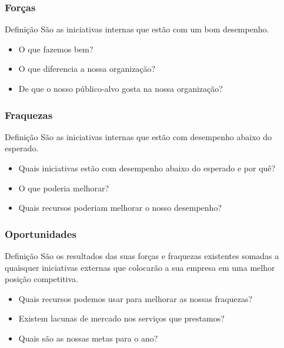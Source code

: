 \documentclass[aspectratio=169]{beamer}
\begin{document}
\begin{frame}
	\frametitle{For\c cas}

	\begin{block}{Defini\c cão}
		São as iniciativas internas que estão com um bom desempenho.
	\end{block}\vfill
	
	\begin{itemize}
		\item O que fazemos bem?
		\item O que diferencia a nossa organização?
		\item De que o nosso público-alvo gosta na nossa organização?
	\end{itemize}
\end{frame}

\begin{frame}
	\frametitle{Fraquezas}

	\begin{block}{Defini\c cão}
		São as iniciativas internas que estão com desempenho abaixo do esperado.
	\end{block}\vfill
	
	\begin{itemize}
		\item Quais iniciativas estão com desempenho abaixo do esperado e por quê?
		\item O que poderia melhorar?
		\item Quais recursos poderiam melhorar o nosso desempenho?
	\end{itemize}
\end{frame}

\begin{frame}
	\frametitle{Oportunidades}

	\begin{block}{Defini\c cão}
		São os resultados das suas forças e fraquezas existentes somadas a quaisquer iniciativas externas que colocarão a sua empresa em uma melhor posição competitiva. 
	\end{block}\vfill
	
	\begin{itemize}
		\item Quais recursos podemos usar para melhorar as nossas fraquezas?
		\item Existem lacunas de mercado nos serviços que prestamos?
		\item Quais são as nossas metas para o ano?
	\end{itemize}
\end{frame}
\end{document}
